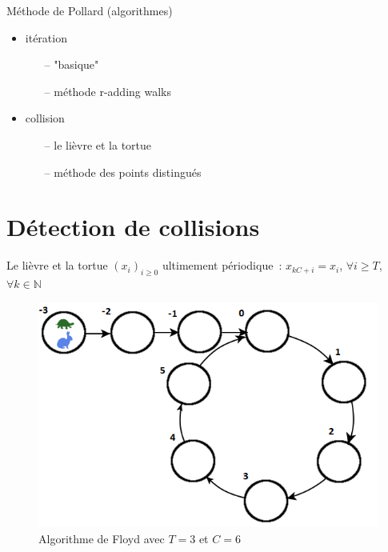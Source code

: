 \documentclass{beamer}
\begin{document}
  \begin{frame}{Méthode de Pollard (algorithmes)}
    \begin{itemize}
      \item itération
        \begin{itemize}
          \item[--] "basique"
          \item[--] méthode r-adding walks
        \end{itemize}
      \item collision
        \begin{itemize}
          \item[--] le lièvre et la tortue
          \item[--] méthode des points distingués
        \end{itemize}
    \end{itemize}
  \end{frame}


  \section{Détection de collisions}

  \begin{frame}{Le lièvre et la tortue}
    $(x_i)_{i \ge 0}$ ultimement périodique~: $x_{kC+i} = x_i$, $\forall i \geq T$, $\forall k \in \mathbb{N}$
    \begin{figure}
      \center{}
      \includegraphics[scale=0.5]{../rapport/images/Floyd.png}
      \caption{Algorithme de Floyd avec $T=3$ et $C=6$}
    \end{figure}
  \end{frame}
\end{document}
